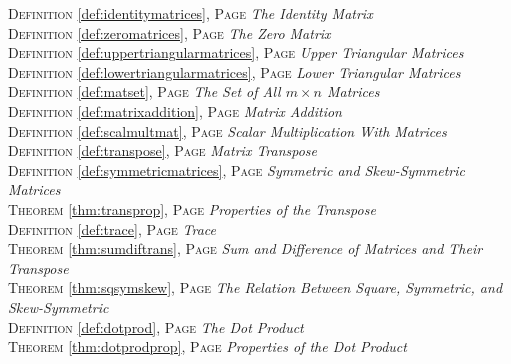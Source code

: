 \begin{multicols}{2}
{         \textsc{Definition} \ref{def:identitymatrices}, \textsc{Page} \pageref{def:identitymatrices} \textit{The Identity Matrix} \\
         \textsc{Definition} \ref{def:zeromatrices}, \textsc{Page} \pageref{def:zeromatrices} \textit{The Zero Matrix} \\
         \textsc{Definition} \ref{def:uppertriangularmatrices}, \textsc{Page} \pageref{def:uppertriangularmatrices} \textit{Upper Triangular Matrices} \\
         \textsc{Definition} \ref{def:lowertriangularmatrices}, \textsc{Page} \pageref{def:lowertriangularmatrices} \textit{Lower Triangular Matrices} \\
         \textsc{Definition} \ref{def:matset}, \textsc{Page} \pageref{def:matset} \textit{The Set of All \(m\times n\) Matrices} \\
         \textsc{Definition} \ref{def:matrixaddition}, \textsc{Page} \pageref{def:matrixaddition} \textit{Matrix Addition} \\
         \textsc{Definition} \ref{def:scalmultmat}, \textsc{Page} \pageref{def:scalmultmat} \textit{Scalar Multiplication With Matrices} \\
         \textsc{Definition} \ref{def:transpose}, \textsc{Page} \pageref{def:transpose} \textit{Matrix Transpose} \\
         \textsc{Definition} \ref{def:symmetricmatrices}, \textsc{Page} \pageref{def:symmetricmatrices} \textit{Symmetric and Skew-Symmetric Matrices} \\
         \textsc{Theorem} \ref{thm:transprop}, \textsc{Page} \pageref{thm:transprop} \textit{Properties of the Transpose} \\
         \textsc{Definition} \ref{def:trace}, \textsc{Page} \pageref{def:trace} \textit{Trace} \\
         \textsc{Theorem} \ref{thm:sumdiftrans}, \textsc{Page} \pageref{thm:sumdiftrans} \textit{Sum and Difference of Matrices and Their Transpose} \\
         \textsc{Theorem} \ref{thm:sqsymskew}, \textsc{Page} \pageref{thm:sqsymskew} \textit{The Relation Between Square, Symmetric, and Skew-Symmetric} \\
         \textsc{Definition} \ref{def:dotprod}, \textsc{Page} \pageref{def:dotprod} \textit{The Dot Product} \\
         \textsc{Theorem} \ref{thm:dotprodprop}, \textsc{Page} \pageref{thm:dotprodprop} \textit{Properties of the Dot Product} \\
}
\end{multicols}
